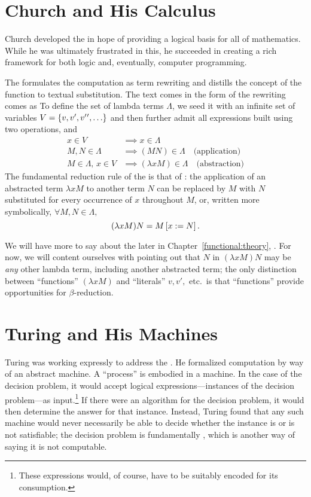 \section{Church and His Calculus}
Church developed the \lambdacalc in hope of providing a logical basis for all of mathematics. While he was ultimately frustrated in this, he succeeded in creating a rich framework for both logic and, eventually, computer programming.

The \lambdacalc formulates the computation as term rewriting and distills the concept of the function to textual substitution. The text comes in the form of  the rewriting comes as  To define the set of lambda terms $\Lambda$, we seed it with an infinite set of variables $V = \set{v, v\prime, v\prime\prime, \dotsc}$ and then further admit all expressions built using two operations,  and 
\begin{align*}
x \in V &\implies x \in \Lambda\\
M,N \in \Lambda &\implies (MN) \in \Lambda \quad\text{(application)}\\
M \in \Lambda,\, x \in V &\implies (\lambda x M) \in \Lambda \quad\text{(abstraction)}
\end{align*}
The fundamental reduction rule of the \lambdacalc is that of : the application of an abstracted term $\lambda x M$ to another term $N$ can be replaced by $M$ with $N$ substituted for every occurrence of $x$ throughout $M$, or, written more symbolically, $\forall M,N \in \Lambda,$
\[
(\lambda x M)N = \replace{x}{N}{M}.
\]

We will have more to say about the \lambdacalc later in Chapter~\ref{functional:theory}, . For now, we will content ourselves with pointing out that $N$ in $(\lambda x M)N$ may be \emph{any} other lambda term, including another abstracted term; the only distinction between ``functions'' $(\lambda x M)$ and ``literals'' $v, v\prime,$ etc.\ is that ``functions'' provide opportunities for $\beta$-reduction.

\section{Turing and His Machines}
Turing was working expressly to address the . He formalized computation by way of an abstract machine. A ``process'' is embodied in a machine. In the case of the decision problem, it would accept logical expressions---instances of the decision problem---as input.\footnote{These expressions would, of course, have to be suitably encoded for its consumption.} If there were an algorithm for the decision problem, it would then determine the answer for that instance. Instead, Turing found that any such machine would never necessarily be able to decide whether the instance is or is not satisfiable; the decision problem is fundamentally , which is another way of saying it is not computable.

